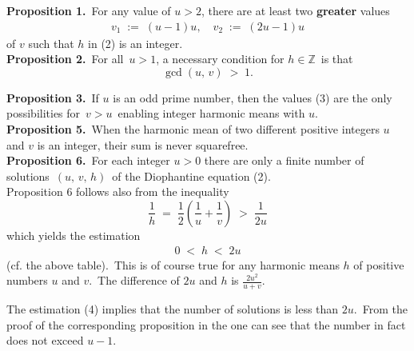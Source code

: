 \documentclass[12pt]{article}
\theoremstyle{definition}
\begin{document}
\textbf{Proposition 1.}\, For any value of $u > 2$, there are at least two \textbf{greater} values  
\begin{align}
v_1 \;:=\; (u\!-\!1)u, \quad v_2 \;:=\; (2u\!-\!1)u
\end{align}
of $v$ such that $h$ in (2) is an integer.\\


\textbf{Proposition 2.}\, For all\, $u > 1$, a necessary condition for $h \in \mathbb{Z}$\, is that
                       $$\gcd(u,\,v) \;>\; 1.$$


\textbf{Proposition 3.}\, If $u$ is an odd prime number, then the values (3) are the only possibilities for\, $v > u$\, enabling integer harmonic means with $u$.\\



\textbf{Proposition 5.}\, When the harmonic mean of two different positive integers $u$ and $v$ is an integer, their sum is never squarefree.\\


\textbf{Proposition 6.}\, For each integer $u > 0$ there are only a finite number of solutions\, $(u,\,v,\,h)$\, of the Diophantine equation (2).\\

Proposition 6 follows also from the inequality
$$\frac{1}{h} \;=\; \frac{1}{2}\!\left(\frac{1}{u}+\frac{1}{v}\right) \;>\; \frac{1}{2u}$$
which yields the estimation
\begin{align}
0 \;<\; h \;<\; 2u
\end{align}
(cf. the above table).\, This is of course true for any harmonic means $h$ of positive numbers $u$ and $v$.\, The difference of $2u$ and $h$ is $\frac{2u^2}{u+v}$.

The estimation (4) implies that the number of solutions is less than $2u$.\, From the proof of the corresponding proposition in the  one can see that the number in fact does not exceed $u\!-\!1$.


\end{document}
